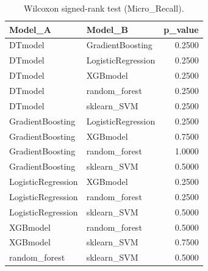\begin{table}[t]
\centering
\begin{tabular}{llr}
\toprule
Model_A & Model_B & p_value \\
\midrule
DTmodel & GradientBoosting & 0.2500 \\
DTmodel & LogisticRegression & 0.2500 \\
DTmodel & XGBmodel & 0.2500 \\
DTmodel & random_forest & 0.2500 \\
DTmodel & sklearn_SVM & 0.2500 \\
GradientBoosting & LogisticRegression & 0.2500 \\
GradientBoosting & XGBmodel & 0.7500 \\
GradientBoosting & random_forest & 1.0000 \\
GradientBoosting & sklearn_SVM & 0.5000 \\
LogisticRegression & XGBmodel & 0.2500 \\
LogisticRegression & random_forest & 0.2500 \\
LogisticRegression & sklearn_SVM & 0.5000 \\
XGBmodel & random_forest & 0.5000 \\
XGBmodel & sklearn_SVM & 0.7500 \\
random_forest & sklearn_SVM & 0.5000 \\
\bottomrule
\end{tabular}
\caption{Wilcoxon signed-rank test (Micro_Recall).}
\label{tab:wilcoxon_Micro_Recall}
\end{table}